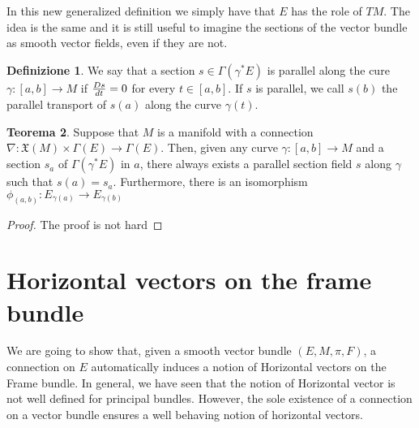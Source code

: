 \documentclass[12pt,a4paper]{report}
\theoremstyle{definition}
\newtheorem{Def}{Definizione}[chapter]
\theoremstyle{Theorem}
\newtheorem{Theo}[Def]{Teorema}
\theoremstyle{definition}
\theoremstyle{definition}
\theoremstyle{definition}
\begin{document}
			In this new generalized definition we simply have that $E$ has the role of $TM$. The idea is the same and it is still useful to imagine the sections of the vector bundle as smooth vector fields, even if they are not.
			\begin{Def}
				We say that a section $s\in\Gamma(\gamma^*E)$ is parallel along the cure $\gamma:[a,b]\rightarrow M$ if ${Ds\over dt}=0$ for every $t\in[a,b]$. If $s$ is parallel, we call $s(b)$ the parallel transport of $s(a)$ along the curve $\gamma(t)$.
			\end{Def}
			\begin{Theo}
				Suppose that $M$ is a manifold with a connection $\nabla:\mathfrak{X}(M)\times\Gamma(E)\rightarrow\Gamma(E)$. Then, given any curve $\gamma:[a,b]\rightarrow M$ and a section $s_a$ of $\Gamma(\gamma^*E)$ in $a$, there always exists a parallel section field $s$ along $\gamma$ such that $s(a)=s_a$. Furthermore, there is an isomorphism $\phi_{(a,b)}:E_{\gamma(a)}\rightarrow E_{\gamma(b)}$
			\end{Theo}
			\begin{proof}
				The proof is not hard
			\end{proof}
		\section{Horizontal vectors on the frame bundle}
			We are going to show that, given a smooth vector bundle $(E,M,\pi,F)$, a connection on $E$ automatically induces a notion of Horizontal vectors on the Frame bundle. In general, we have seen that the notion of Horizontal vector is not well defined for principal bundles. However, the sole existence of a connection on a vector bundle ensures a well behaving notion of horizontal vectors.
\end{document}
